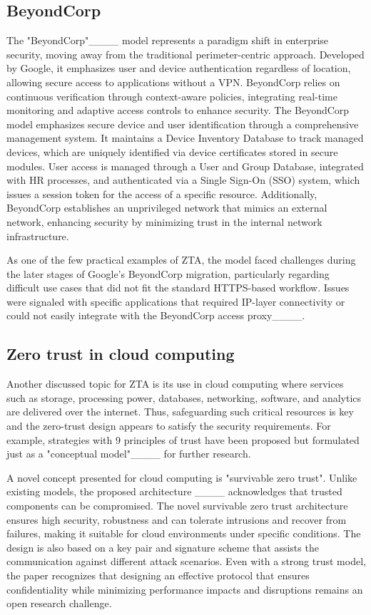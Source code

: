 \subsection{BeyondCorp}
The "BeyondCorp"____ model represents a paradigm shift in enterprise security, moving away from the traditional perimeter-centric approach. Developed by Google, it emphasizes user and device authentication regardless of location, allowing secure access to applications without a VPN. BeyondCorp relies on continuous verification through context-aware policies, integrating real-time monitoring and adaptive access controls to enhance security. The BeyondCorp model emphasizes secure device and user identification through a comprehensive management system. It maintains a Device Inventory Database to track managed devices, which are uniquely identified via device certificates stored in secure modules. User access is managed through a User and Group Database, integrated with HR processes, and authenticated via a Single Sign-On (SSO) system, which issues a session token for the access of a specific resource. Additionally, BeyondCorp establishes an unprivileged network that mimics an external network, enhancing security by minimizing trust in the internal network infrastructure.

As one of the few practical examples of ZTA, the model faced challenges during the later stages of Google's BeyondCorp migration, particularly regarding difficult use cases that did not fit the standard HTTPS-based workflow. Issues were signaled with specific applications that required IP-layer connectivity or could not easily integrate with the BeyondCorp access proxy____.

\subsection{Zero trust in cloud computing}

Another discussed topic for ZTA is its use in cloud computing where services such as storage, processing power, databases, networking, software, and analytics are delivered over the internet. Thus, safeguarding such critical resources is key and the zero-trust design appears to satisfy the security requirements. For example, strategies with 9 principles of trust have been proposed but formulated just as a "conceptual model"____ for further research.

A novel concept presented for cloud computing is "survivable zero trust". Unlike existing models, the proposed architecture ____ acknowledges that trusted components can be compromised. The novel survivable zero trust architecture ensures high security, robustness and can tolerate intrusions and recover from failures, making it suitable for cloud environments under specific conditions. The design is also based on a key pair and signature scheme that assists the communication against different attack scenarios. Even with a strong trust model, the paper recognizes that designing an effective protocol that ensures confidentiality while minimizing performance impacts and disruptions remains an open research challenge.

